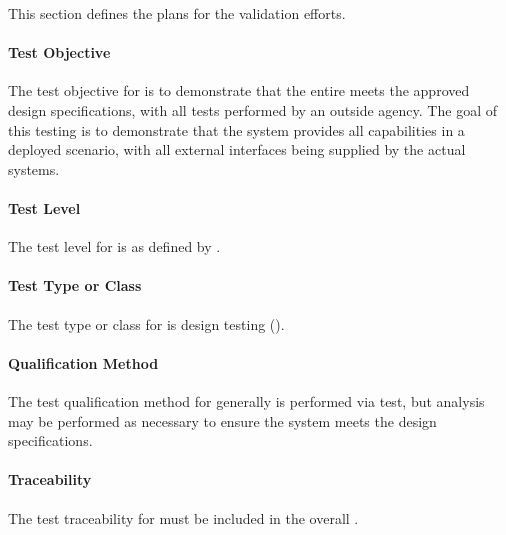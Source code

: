 


This section defines the plans for the \TestIdNameX validation efforts.

\paragraph{Test Objective}
\label{loc:TestObjective\TestIdName}

The test objective for \TestIdNameX is to demonstrate that the entire \ThisSys meets the approved design specifications, with all tests performed by an outside agency.
The goal of this testing is to demonstrate that the system provides all capabilities in a deployed scenario, with all external interfaces being supplied by the actual systems.

\paragraph{Test Level}
\label{loc:TestLevels\TestIdName}

The test level for \TestIdNameX is \StageSeven as defined by \citeStageTestingSTD.

\paragraph{Test Type or Class}
\label{loc:TestType\TestIdName}

The test type or class for \TestIdNameX is design testing (\StageDT).

\paragraph{Qualification Method}
\label{loc:TestQualificationMethod\TestIdName}

The test qualification method for \TestIdNameX generally is performed via test, but analysis may be performed as necessary to ensure the system meets the design specifications.

\paragraph{Traceability}
\label{loc:TestTraceability\TestIdName}

The test traceability for \TestIdNameX must be included in the overall \RTVM.

